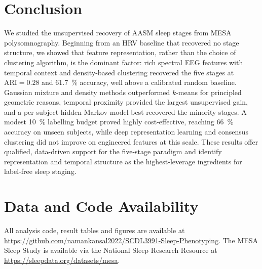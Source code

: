 \documentclass[11pt,a4paper]{article}
\begin{document}
\section{Conclusion}
We studied the unsupervised recovery of AASM sleep stages from MESA
polysomnography. Beginning from an HRV baseline that recovered no stage structure,
we showed that feature representation, rather than the choice of clustering
algorithm, is the dominant factor: rich spectral EEG features with temporal context
and density-based clustering recovered the five stages at $\text{ARI}=0.28$ and
\SI{61.7}{\percent} accuracy, well above a calibrated random baseline. Gaussian
mixture and density methods outperformed $k$-means for principled geometric
reasons, temporal proximity provided the largest unsupervised gain, and a
per-subject hidden Markov model best recovered the minority stages. A modest
\SI{10}{\percent} labelling budget proved highly cost-effective, reaching
\SI{66}{\percent} accuracy on unseen subjects, while deep representation learning
and consensus clustering did not improve on engineered features at this scale.
These results offer qualified, data-driven support for the five-stage paradigm and
identify representation and temporal structure as the highest-leverage ingredients
for label-free sleep staging.

\section*{Data and Code Availability}
\small
All analysis code, result tables and figures are available at
\url{https://github.com/namankansal2022/SCDL3991-Sleep-Phenotyping}. The MESA Sleep
Study is available via the National Sleep Research Resource at
\url{https://sleepdata.org/datasets/mesa}.
\end{document}
